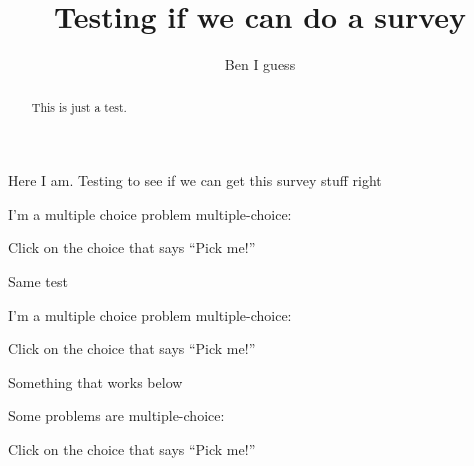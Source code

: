 \documentclass{ximera}
\title{Testing if we can do a survey}
\author{Ben I guess}
\begin{document}
\begin{abstract}
  This is just a test.
\end{abstract}\maketitle


Here I am. Testing to see if we can get this survey stuff right



\begin{problem}
  I'm a multiple choice problem multiple-choice:
  \begin{multipleChoice}
  \end{multipleChoice}
  \begin{hint}
    Click on the choice that says ``Pick me!''
  \end{hint}
\end{problem}

Same test


\begin{problem}
  I'm a multiple choice problem multiple-choice:
  \begin{multipleChoice}
  \end{multipleChoice}
  \begin{hint}
    Click on the choice that says ``Pick me!''
  \end{hint}
\end{problem}

Something that works below

\begin{problem}
  Some problems are multiple-choice:
  \begin{multipleChoice}
  \end{multipleChoice}
  \begin{hint}
    Click on the choice that says ``Pick me!''
  \end{hint}
\end{problem}
\end{document}
